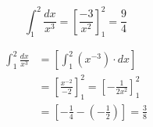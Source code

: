 \documentclass[14pt,fleqn]{extarticle}
\newcommand\intg{\int_1^2 \frac{dx}{x^3}}
\begin{document}
 
\begin{snippet}
    \incorrect
    
    \[ \intg = \left[\frac{-3}{x^2} \right]_1^2 = \frac{9}{4} \]
    
    \reason
    
    \begin{align}
	\intg &= \left[ \int_1^2 \left(x^{-3} \right)\cdot dx \right] \\
	&= \left[\frac{x^{-2}}{-2} \right]_1^2 = \left[-\frac{1}{2x^2} \right]_1^2 \\
	&= \left[-\frac{1}{4} - \left(-\frac{1}{2} \right) \right] = \frac{3}{8} 
\end{align}
    
\end{snippet} 
\end{document}
